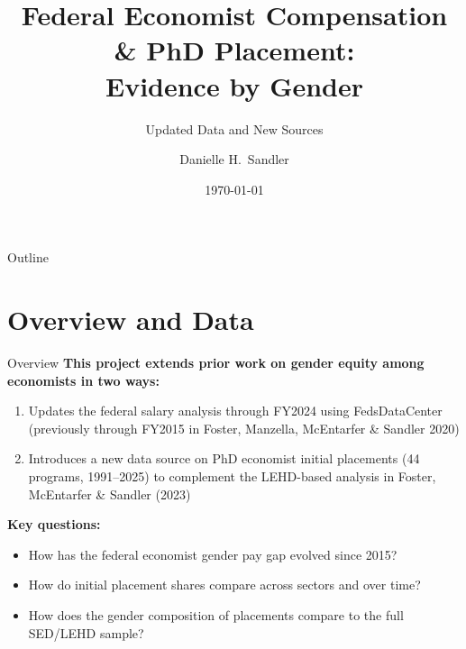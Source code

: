 \documentclass[aspectratio=169]{beamer}
\title{Federal Economist Compensation \& PhD Placement:\\
       Evidence by Gender}
\subtitle{Updated Data and New Sources}
\author{Danielle H.\ Sandler}
\institute{U.S.\ Census Bureau}
\date{\today}
\begin{document}
\begin{frame}
  \titlepage
\end{frame}

\begin{frame}{Outline}
  \tableofcontents
\end{frame}

\section{Overview and Data}

\begin{frame}{Overview}
  \textbf{This project extends prior work on gender equity among economists in two ways:}
  \begin{enumerate}
    \item Updates the federal salary analysis through FY2024 using FedsDataCenter
          (previously through FY2015 in Foster, Manzella, McEntarfer \& Sandler 2020)
    \item Introduces a new data source on PhD economist initial placements
          (44 programs, 1991--2025) to complement the LEHD-based analysis
          in Foster, McEntarfer \& Sandler (2023)
  \end{enumerate}
  \vspace{0.5em}
  \textbf{Key questions:}
  \begin{itemize}
    \item How has the federal economist gender pay gap evolved since 2015?
    \item How do initial placement shares compare across sectors and over time?
    \item How does the gender composition of placements compare to the full SED/LEHD sample?
  \end{itemize}
\end{frame}
\end{document}
